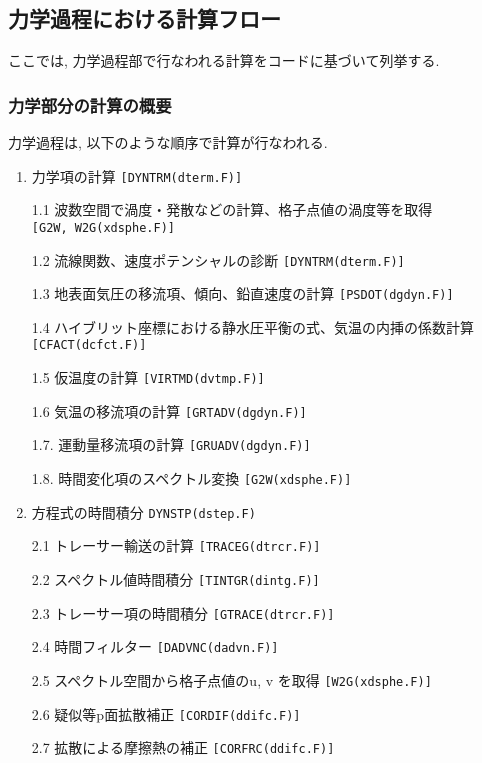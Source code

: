 \hypertarget{ux529bux5b66ux904eux7a0bux306bux304aux3051ux308bux8a08ux7b97ux30d5ux30edux30fc}{%
\subsection{力学過程における計算フロー}\label{ux529bux5b66ux904eux7a0bux306bux304aux3051ux308bux8a08ux7b97ux30d5ux30edux30fc}}

ここでは, 力学過程部で行なわれる計算をコードに基づいて列挙する.

\hypertarget{ux529bux5b66ux90e8ux5206ux306eux8a08ux7b97ux306eux6982ux8981}{%
\subsubsection{力学部分の計算の概要}\label{ux529bux5b66ux90e8ux5206ux306eux8a08ux7b97ux306eux6982ux8981}}

力学過程は, 以下のような順序で計算が行なわれる.

\begin{enumerate}
\def\labelenumi{\arabic{enumi}.}
\item
  力学項の計算 \texttt{{[}DYNTRM(dterm.F){]}}

  1.1 波数空間で渦度・発散などの計算、格子点値の渦度等を取得
  \texttt{{[}G2W,\ W2G(xdsphe.F){]}}

  1.2 流線関数、速度ポテンシャルの診断 \texttt{{[}DYNTRM(dterm.F){]}}

  1.3 地表面気圧の移流項、傾向、鉛直速度の計算
  \texttt{{[}PSDOT(dgdyn.F){]}}

  1.4 ハイブリット座標における静水圧平衡の式、気温の内挿の係数計算
  \texttt{{[}CFACT(dcfct.F){]}}

  1.5 仮温度の計算 \texttt{{[}VIRTMD(dvtmp.F){]}}

  1.6 気温の移流項の計算 \texttt{{[}GRTADV(dgdyn.F){]}}

  1.7. 運動量移流項の計算 \texttt{{[}GRUADV(dgdyn.F){]}}

  1.8. 時間変化項のスペクトル変換 \texttt{{[}G2W(xdsphe.F){]}}
\item
  方程式の時間積分 \texttt{DYNSTP(dstep.F)}

  2.1 トレーサー輸送の計算 \texttt{{[}TRACEG(dtrcr.F){]}}

  2.2 スペクトル値時間積分 \texttt{{[}TINTGR(dintg.F){]}}

  2.3 トレーサー項の時間積分 \texttt{{[}GTRACE(dtrcr.F){]}}

  2.4 時間フィルター \texttt{{[}DADVNC(dadvn.F){]}}

  2.5 スペクトル空間から格子点値のu, v を取得
  \texttt{{[}W2G(xdsphe.F){]}}

  2.6 疑似等p面拡散補正 \texttt{{[}CORDIF(ddifc.F){]}}

  2.7 拡散による摩擦熱の補正 \texttt{{[}CORFRC(ddifc.F){]}}
\end{enumerate}
